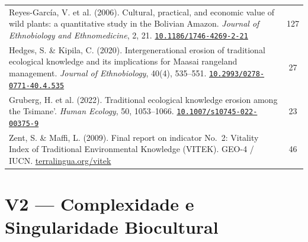 \documentclass[a4paper,11pt]{article}
\newcommand{\doi}[1]{\href{https://doi.org/#1}{\texttt{#1}}}
\begin{document}
\begin{longtable}{>{\raggedright\arraybackslash}p{} c}
Reyes-García, V. et al. (2006). Cultural, practical, and economic value of wild plants: a quantitative study in the Bolivian Amazon. \textit{Journal of Ethnobiology and Ethnomedicine}, 2, 21.\newline
\doi{10.1186/1746-4269-2-21} & 127 \\
\addlinespace

Hedges, S. \& Kipila, C. (2020). Intergenerational erosion of traditional ecological knowledge and its implications for Maasai rangeland management. \textit{Journal of Ethnobiology}, 40(4), 535--551.\newline
\doi{10.2993/0278-0771-40.4.535} & 27 \\
\addlinespace

Gruberg, H. et al. (2022). Traditional ecological knowledge erosion among the Tsimane'. \textit{Human Ecology}, 50, 1053--1066.\newline
\doi{10.1007/s10745-022-00375-9} & 23 \\
\addlinespace

Zent, S. \& Maffi, L. (2009). Final report on indicator No.~2: Vitality Index of Traditional Environmental Knowledge (VITEK). GEO-4 / IUCN.\newline
\href{https://www.terralingua.org/vitek/}{terralingua.org/vitek} & 46 \\

\bottomrule
\end{longtable}

\section{V2 --- Complexidade e Singularidade Biocultural}
\end{document}
